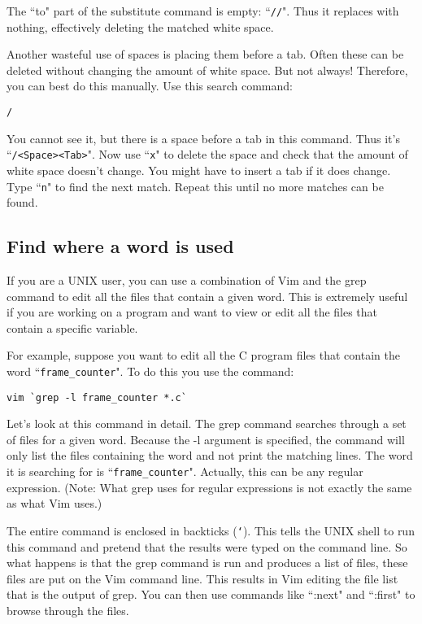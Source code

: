 The ``to" part of the substitute command is empty: ``\texttt{//}".
Thus it replaces with nothing, effectively deleting the matched white space.

Another wasteful use of spaces is placing them before a tab.
Often these can be deleted without changing the amount of white space.
But not always!  Therefore, you can best do this manually.
Use this search command:

\begin{Verbatim}[samepage=true]
 /
\end{Verbatim}

You cannot see it, but there is a space before a tab in this command.
Thus it's ``\texttt{/<Space><Tab>}".
Now use ``\texttt{x}" to delete the space and check that the amount of white space doesn't change.
You might have to insert a tab if it does change.
Type ``\texttt{n}" to find the next match.
Repeat this until no more matches can be found.
\subsection{Find where a word is used}
If you are a UNIX user, you can use a combination of Vim and the grep command to edit all the files that contain a given word.
This is extremely useful if you are working on a program and want to view or edit all the files that contain a specific variable.

For example, suppose you want to edit all the C program files that contain the word ``\texttt{frame\_counter}".
To do this you use the command:

\begin{Verbatim}[samepage=true]
 vim `grep -l frame_counter *.c`
\end{Verbatim}

Let's look at this command in detail.
The grep command searches through a set of files for a given word.
Because the -l argument is specified, the command will only list the files containing the word and not print the matching lines.
The word it is searching for is ``\texttt{frame\_counter}".
Actually, this can be any regular expression.
(Note: What grep uses for regular expressions is not exactly the same as what Vim uses.)

The entire command is enclosed in backticks (\texttt{`}).
This tells the UNIX shell to run this command and pretend that the results were typed on the command line.
So what happens is that the grep command is run and produces a list of files, these files are put on the Vim command line.
This results in Vim editing the file list that is the output of grep.
You can then use commands like ``:next" and ``:first" to browse through the files.

